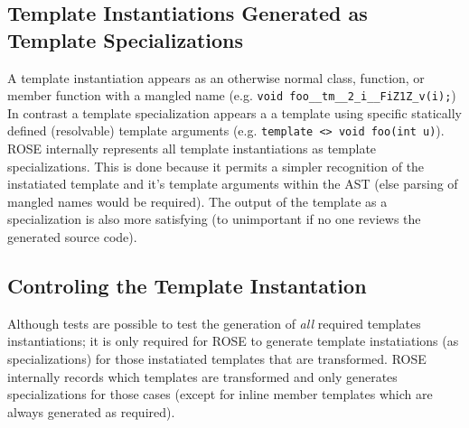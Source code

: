 {\subsection{Template Instantiations Generated as Template Specializations}
   A template instantiation appears as an otherwise normal class, function, or member
function with a mangled name (e.g. {\tt void foo\_\_tm\_\_2\_i\_\_FiZ1Z\_v(i);})
In contrast a template specialization appears a a template using specific
statically defined (resolvable) template arguments (e.g. 
{\tt template <> void foo(int u)}).  ROSE internally represents all 
template instantiations as template specializations.  This is done 
because it permits a simpler recognition of the instatiated template and it's template
arguments within the AST (else parsing of mangled names would be required).  The output 
of the template as a specialization is also more satisfying (to unimportant if no
one reviews the generated source code).


\subsection{Controling the Template Instantation}
   Although tests are possible to test the generation of {\em all} required 
templates instantiations; it is only required for ROSE to generate template
instatiations (as specializations) for those instatiated templates that are
transformed.  ROSE internally records which templates are transformed
and only generates specializations for those cases (except for inline member
templates which are always generated as required).


}
